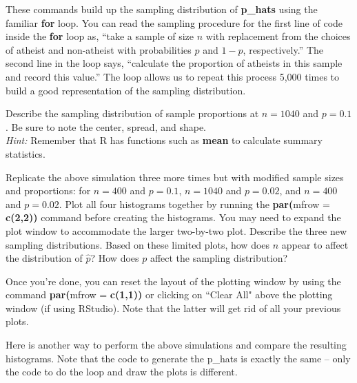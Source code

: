 \documentclass{article}\usepackage[]{graphicx}\usepackage[]{color}
\newcommand{\hlnum}[1]{\textcolor[rgb]{0.686,0.059,0.569}{#1}}%
\newcommand{\hlkwc}[1]{\textcolor[rgb]{0.333,0.667,0.333}{#1}}%
\newcommand{\hlkwd}[1]{\textcolor[rgb]{0.737,0.353,0.396}{\textbf{#1}}}%
\begin{document}
These commands build up the sampling distribution of \hlkwd{p\_hats} using the familiar \hlkwd{for} loop. You can read the sampling procedure for the first line of code inside the \hlkwd{for} loop as, ``take a sample of size $n$ with replacement from the choices of atheist and non-atheist with probabilities $p$ and $1 - p$, respectively.'' The second line in the loop says, ``calculate the proportion of atheists in this sample and record this value.'' The loop allows us to repeat this process 5,000 times to build a good representation of the sampling distribution.

\begin{exercise}
Describe the sampling distribution of sample proportions at $n = 1040$ and $p = 0.1$. Be sure to note the center, spread, and shape. \\
\textit{Hint:} Remember that R has functions such as \hlkwd{mean} to calculate summary statistics.
\end{exercise}

\begin{exercise}
Replicate the above simulation three more times but with modified sample sizes and proportions: for $n = 400$ and $p = 0.1$, $n = 1040$ and $p = 0.02$, and $n = 400$ and $p = 0.02$. Plot all four histograms together by running the \hlkwd{par(}\hlkwc{mfrow = }\hlkwd{c(}\hlkwd{2,2}\hlkwd{))} command before creating the histograms. You may need to expand the plot window to accommodate the larger two-by-two plot. Describe the three new sampling distributions. Based on these limited plots, how does $n$ appear to affect the distribution of $\hat{p}$? How does $p$ affect the sampling distribution?
\end{exercise}

Once you're done, you can reset the layout of the plotting window by using the command \hlkwd{par(}\hlkwc{mfrow = }\hlkwd{c(}\hlkwd{1,1}\hlkwd{))} or clicking on ``Clear All" above the plotting window (if using RStudio). Note that the latter will get rid of all your previous plots.

Here is another way to perform the above simulations and compare the resulting histograms. Note that the code to generate the \hlnum{p\_hats} is exactly the same -- only the code to do the loop and draw the plots is different. 
\end{document}

